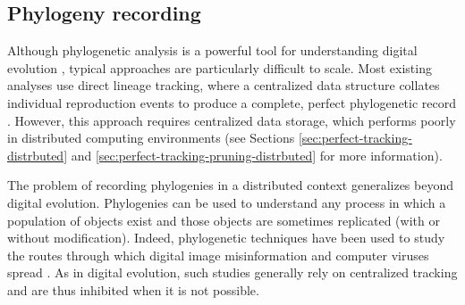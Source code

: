 \subsection{Phylogeny recording}

Although phylogenetic analysis is a powerful tool for understanding digital evolution \citep{dolson2020interpreting}, typical approaches are particularly difficult to scale.
Most existing analyses use direct lineage tracking, where a centralized data structure collates individual reproduction events to produce a complete, perfect phylogenetic record \citep{dolson2024phylotrack}.
However, this approach requires centralized data storage, which performs poorly in distributed computing environments (see Sections \ref{sec:perfect-tracking-distrbuted} and \ref{sec:perfect-tracking-pruning-distrbuted} for more information).

The problem of recording phylogenies in a distributed context generalizes beyond digital evolution.
Phylogenies can be used to understand any process in which a population of objects exist and those objects are sometimes replicated (with or without modification).
Indeed, phylogenetic techniques have been used to study the routes through which digital image misinformation and computer viruses spread \citep{friggeri2014rumor,cohen1987computer}.
As in digital evolution, such studies generally rely on centralized tracking and are thus inhibited when it is not possible.




